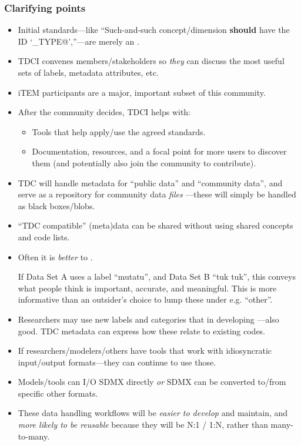 \documentclass[12pt,aspectratio=169]{beamer}
\begin{document}
\begin{frame}
\frametitle{Clarifying points}

\begin{itemize}
  \item Initial standards—like “Such-and-such concept/dimension \textbf{should} have the ID ‘\verb@VEHICLE_TYPE@’,”—are merely an .
  \item TDCI convenes members/stakeholders so \emph{they} can discuss the most useful sets of labels, metadata attributes, etc.
  \item iTEM participants are a major, important subset of this community.
  \item After the community decides, TDCI helps with:
    \begin{itemize}
      \item Tools that help apply/use the agreed standards.
      \item Documentation, resources, and a focal point for more users to discover them (and potentially also join the community to contribute).
    \end{itemize}
\end{itemize}

\framebreak
{}
\begin{itemize}
  \item TDC will handle metadata for “public data” and “community data”, and serve as a repository for community data \emph{files} —these will simply be handled as black boxes/blobs.
  \item “TDC compatible” (meta)data can be shared without using shared concepts and code lists.

  \item Often it is \emph{better} to .

  If Data Set A uses a label “mutatu”, and Data Set B “tuk tuk”, this conveys what people think is important, accurate, and meaningful. This is more informative than an outsider's choice to lump these under e.g. “other”.
  \item Researchers may use new labels and categories that in developing —also good. TDC metadata can express how these relate to existing codes.
\end{itemize}

\framebreak
{}
\begin{itemize}
  \item If researchers/modelers/others have tools that work with idiosyncratic input/output formats—they can continue to use those.
  \item Models/tools can I/O SDMX directly \emph{or} SDMX can be converted to/from specific other formats.
  \item These data handling workflows will be \emph{easier to develop} and maintain, and \emph{more likely to be reusable} because they will be N:1 / 1:N, rather than many-to-many.
\end{itemize}


\end{frame}
\end{document}
